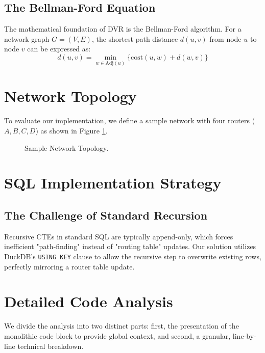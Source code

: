 \documentclass[twocolumn,a4paper,10pt]{article}
\begin{document}
\subsection{The Bellman-Ford Equation}
The mathematical foundation of DVR is the Bellman-Ford algorithm. For a network graph $G = (V, E)$, the shortest path distance $d(u, v)$ from node $u$ to node $v$ can be expressed as:
\begin{equation}
d(u, v) = \min_{w \in \text{Adj}(u)} \{ \text{cost}(u, w) + d(w, v) \}
\end{equation}

\section{Network Topology}
To evaluate our implementation, we define a sample network with four routers ($A, B, C, D$) as shown in Figure \ref{fig:topology}.

\begin{figure}[h]
\centering
{}
\caption{Sample Network Topology.}
\label{fig:topology}
\end{figure}

\section{SQL Implementation Strategy}
\subsection{The Challenge of Standard Recursion}
Recursive CTEs in standard SQL are typically append-only, which forces inefficient "path-finding" instead of "routing table" updates. Our solution utilizes DuckDB's \texttt{USING KEY} clause to allow the recursive step to overwrite existing rows, perfectly mirroring a router table update.

\section{Detailed Code Analysis}
We divide the analysis into two distinct parts: first, the presentation of the monolithic code block to provide global context, and second, a granular, line-by-line technical breakdown.
\end{document}
